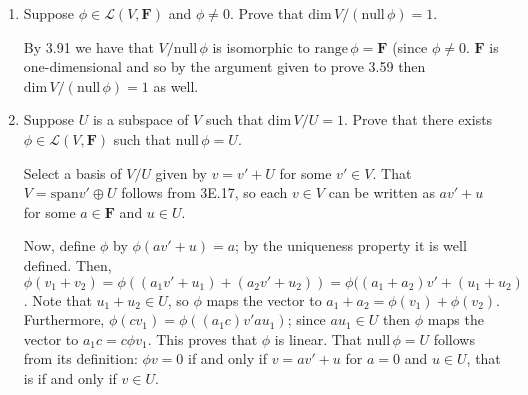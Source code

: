\documentclass{book}
\begin{document}
\begin{enumerate}
(b) Prove that \(\textbf{F}^\infty/U\) is infinite-dimensional.

Consider the sequence of sequences

\begin{equation*}
    \begin{split}
        &(0,1,0,1,\dots) \\
        &(0,0,1,0,0,1,\dots) \\
        &\vdots
    \end{split}
\end{equation*}

and so on, for every prime (of which there are an infinite number).  All of them are "base vectors" of different elements of the quotient space, since they all differ from the others by an infinite amount of slots.  Furthermore, they are all linearly independent, since the fact that we have chosen prime spacings ensures that there is only one sequence that has ones in each set of prime multiple slots.  Thus, any linear combination of their corresponding affine subsets in \(\textbf{F}^\infty/U\) must then have each coefficient equal to zero.  The quotient space is then infinite-dimensional by 2A.14.

\item Suppose \(\phi \in \mathcal{L}(V,\textbf{F})\) and \(\phi \neq 0\).  Prove that \(\textrm{dim} \, V/(\textrm{null} \, \phi)=1\).

By 3.91 we have that \(V/\text{null} \, \phi\) is isomorphic to \(\text{range} \, \phi = \textbf{F}\) (since \(\phi \neq 0\).  \(\textbf{F}\) is one-dimensional and so by the argument given to prove 3.59 then \(\text{dim} \, V/(\textrm{null} \, \phi)=1\) as well.

\item Suppose \(U\) is a subspace of \(V\) such that \(\textrm{dim} \, V/U=1\).  Prove that there exists \(\phi \in \mathcal{L}(V,\textbf{F})\) such that \(\textrm{null} \, \phi = U\).

Select a basis of \(V/U\) given by \(v=v'+U\) for some \(v' \in V\).  That \(V=\text{span}v' \oplus U\) follows from 3E.17, so each \(v \in V\) can be written as \(av'+u\) for some \(a \in \textbf{F}\) and \(u \in U\).

Now, define \(\phi\) by \(\phi(av'+u) = a\); by the uniqueness property it is well defined.  Then, \(\phi(v_1+v_2)=\phi((a_1v'+u_1)+(a_2v'+u_2))=\phi((a_1+a_2)v'+(u_1+u_2)\).  Note that \(u_1+u_2 \in U\), so \(\phi\) maps the vector to \(a_1+a_2=\phi(v_1)+\phi(v_2)\).  Furthermore, \(\phi(cv_1)=\phi((a_1c)v'au_1)\); since \(au_1 \in U\) then \(\phi\) maps the vector to \(a_1c = c\phi v_1\).  This proves that \(\phi\) is linear.  That \(\text{null} \, \phi=U\) follows from its definition: \(\phi v=0\) if and only if \(v=av'+u\) for \(a=0\) and \(u \in U\), that is if and only if \(v \in U\).


\end{enumerate}
\end{document}

